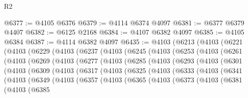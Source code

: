 \begin{lexlean}{R2}
\begin{coremodule}
@6377 := @4105 @6376
@6379 := @4114 @6374 @4097
@6381 := @6377 @6379 @4407
@6382 := @6125 @2168
@6384 := @4107 @6382 @4097
@6385 := @4105 @6384
@6387 := @4114 @6382 @4097
@6435 := @4103
    (@6213
      (@4103
        (@6221
          (@4103
            (@6229
              (@4103
                (@6237
                  (@4103
                    (@6245
                      (@4103
                        (@6253
                          (@4103
                            (@6261
                              (@4103
                                (@6269
                                  (@4103
                                    (@6277
                                      (@4103
                                        (@6285
                                          (@4103
                                            (@6293
                                              (@4103
                                                (@6301
                                                  (@4103
                                                    (@6309
                                                      (@4103
                                                        (@6317
                                                          (@4103
                                                            (@6325
                                                              (@4103
                                                                (@6333
                                                                  (@4103
                                                                    (@6341
                                                                      (@4103
                                                                        (@6349
                                                                          (@4103
                                                                            (@6357
                                                                              (@4103
                                                                                (@6365
                                                                                  (@4103
                                                                                    (@6373
                                                                                      (@4103
                                                                                        (@6381
                                                                                          (@4103
                                                                                            (@6385

\end{coremodule}
\end{lexlean}
